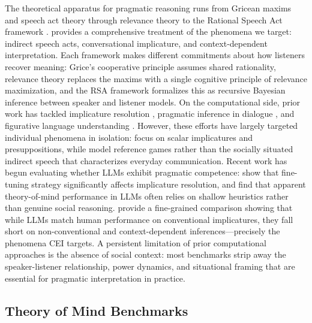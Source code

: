 \documentclass[twoside,11pt]{article}
\begin{document}
The theoretical apparatus for pragmatic reasoning runs from Gricean maxims \citep{grice1975logic} and speech act theory \citep{searle1975indirect} through relevance theory \citep{sperber1986relevance} to the Rational Speech Act framework \citep{goodman2016pragmatic}. \citet{levinson1983pragmatics} provides a comprehensive treatment of the phenomena we target: indirect speech acts, conversational implicature, and context-dependent interpretation. Each framework makes different commitments about how listeners recover meaning: Grice's cooperative principle assumes shared rationality, relevance theory replaces the maxims with a single cognitive principle of relevance maximization, and the RSA framework \citep{goodman2016pragmatic} formalizes this as recursive Bayesian inference between speaker and listener models. On the computational side, prior work has tackled implicature resolution \citep{jeretic2020natural}, pragmatic inference in dialogue \citep{andreas2016reasoning}, and figurative language understanding \citep{joshi2017automatic}. However, these efforts have largely targeted individual phenomena in isolation: \citet{jeretic2020natural} focus on scalar implicatures and presuppositions, while \citet{andreas2016reasoning} model reference games rather than the socially situated indirect speech that characterizes everyday communication. Recent work has begun evaluating whether LLMs exhibit pragmatic competence: \citet{ruis2023goldilocks} show that fine-tuning strategy significantly affects implicature resolution, and \citet{shapira2024clever} find that apparent theory-of-mind performance in LLMs often relies on shallow heuristics rather than genuine social reasoning. \citet{hu2023fine} provide a fine-grained comparison showing that while LLMs match human performance on conventional implicatures, they fall short on non-conventional and context-dependent inferences---precisely the phenomena CEI targets. A persistent limitation of prior computational approaches is the absence of social context: most benchmarks strip away the speaker-listener relationship, power dynamics, and situational framing that are essential for pragmatic interpretation in practice.

\subsection{Theory of Mind Benchmarks}
\end{document}
